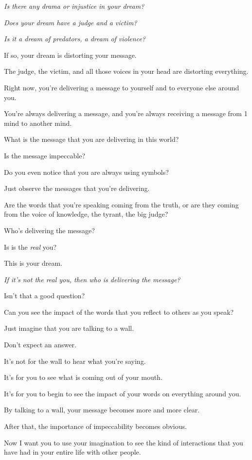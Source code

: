 \documentclass{article}
\numberwithin{equation}{section}
\begin{document}
\textit{Is there any drama or injustice in your dream?}

\textit{Does your dream have a judge and a victim?}

\textit{Is it a dream of predators, a dream of violence?}

If so, your dream is distorting your message.

The judge, the victim, and all those voices in your head are distorting everything.

%
Right now, you're delivering a message to yourself and to everyone else around you.

You're always delivering a message, and you're always receiving a message from 1 mind to another mind.

What is the message that you are delivering in this world?

Is the message impeccable?

Do you even notice that you are always using symbols?

%
Just observe the messages that you're delivering.

Are the words that you're speaking coming from the truth, or are they coming from the voice of knowledge, the tyrant, the big judge?

Who's delivering the message?

Is is the \textit{real} you?

This is your dream.

\textit{If it's not the real you, then who is delivering the message?}

Isn't that a good question?

%
Can you see the impact of the words that you reflect to others as you speak?

Just imagine that you are talking to a wall.

Don't expect an answer.

It's not for the wall to hear what you're saying.

It's for you to see what is coming out of your mouth.

It's for you to begin to see the impact of your words on everything around you.

By talking to a wall, your message becomes more and more clear.

After that, the importance of impeccability becomes obvious.

%
Now I want you to use your imagination to see the kind of interactions that you have had in your entire life with other people.
\end{document}

